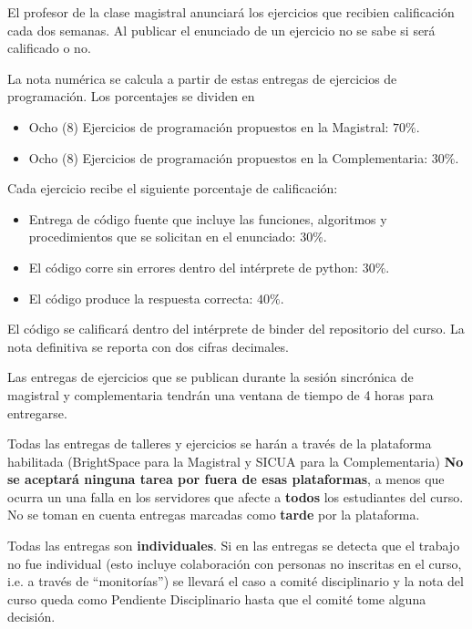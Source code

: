 \documentclass[letterpaper,10pt,onecolumn]{article}
\begin{document}
El profesor de la clase magistral anunciar\'a los ejercicios que
recibien calificaci\'on cada dos semanas.
Al publicar el enunciado de un ejercicio no se sabe si ser\'a
calificado o no.

La nota num\'erica se calcula a partir de estas entregas de ejercicios de
programaci\'on. Los porcentajes se dividen en

\begin{itemize}
    \item Ocho (8) Ejercicios de programaci\'on propuestos en la
      Magistral: $70\%$.   
    \item Ocho (8) Ejercicios de programaci\'on propuestos en la
      Complementaria: $30\%$.  
\end{itemize}


Cada ejercicio recibe el siguiente porcentaje de calificaci\'on:
\begin{itemize}
\item Entrega de c\'odigo fuente que incluye las funciones, algoritmos
  y procedimientos que se solicitan en el enunciado: $30\%$.  
\item El c\'odigo corre sin errores dentro del int\'erprete de python: $30\%$.
\item El c\'odigo produce la respuesta correcta: $40\%$.
\end{itemize}
El c\'odigo se calificar\'a dentro del int\'erprete de binder del
repositorio del curso.
La nota definitiva se reporta con dos cifras decimales.

Las entregas de ejercicios que se publican durante la sesi\'on
sincr\'onica de magistral y complementaria tendr\'an una ventana de
tiempo de 4 horas para entregarse.

Todas las entregas de talleres y ejercicios se har\'an a trav\'es de 
la plataforma habilitada (BrightSpace para la Magistral y SICUA para
la Complementaria)
{\bf No se aceptar\'a ninguna tarea por fuera de esas plataformas}, a
menos que ocurra un una falla en los servidores que afecte a {\bf todos} los
estudiantes del curso. 
No se toman en cuenta entregas marcadas como {\bf tarde} por la plataforma. 

Todas las entregas son \textbf{individuales}.  
Si en las entregas se detecta que el trabajo no fue individual (esto
incluye colaboraci\'on con personas no inscritas en el curso, i.e. a
trav\'es de ``monitor\'ias'') se llevar\'a el caso a comit\'e
disciplinario y la nota del curso queda como Pendiente Disciplinario
hasta que el comit\'e tome alguna decisi\'on.  
\end{document}
